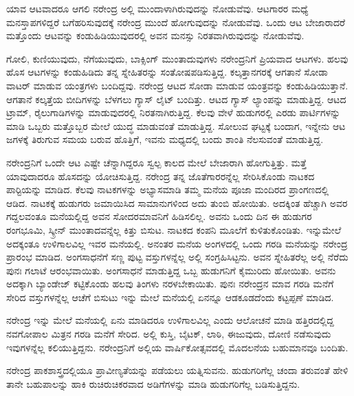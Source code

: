 ಯಾವ ಆಟವಾದರೂ ಆಗಲಿ ನರೇಂದ್ರ ಅಲ್ಲಿ ಮುಂದಾಳಾಗಿರುವುದನ್ನು ನೋಡುವೆವು. ಆಟಗಾರರ ಮಧ್ಯೆ ಮನಸ್ತಾಪಗಳಿದ್ದರೆ ಬಗೆಹರಿಸುವುದಕ್ಕೆ ನರೇಂದ್ರ ಮುಂದೆ ಹೋಗುವುದನ್ನು ನೋಡುವೆವು. ಒಂದು ಆಟ ಬೇಜಾರಾದರೆ ಮತ್ತೊಂದು ಆಟವನ್ನು ಕಂಡುಹಿಡಿಯುವುದರಲ್ಲಿ ಅವನ ಮನಸ್ಸು ನಿರತವಾಗಿರುವುದನ್ನು ನೋಡುವೆವು.

ಗೋಲಿ, ಕುಣಿಯುವುದು, ನೆಗೆಯುವುದು, ಬಾಕ್ಸಿಂಗ್ ಮುಂತಾದುವುಗಳು ನರೇಂದ್ರನಿಗೆ ಪ್ರಿಯವಾದ ಆಟಗಳು. ಹಲವು ಹೊಸ ಆಟಗಳನ್ನು ಕಂಡುಹಿಡಿದು ತನ್ನ ಸ್ನೇಹಿತರನ್ನು ಸಂತೋಷಪಡಿಸುತ್ತಿದ್ದ. ಕಲ್ಕತ್ತಾನಗರಕ್ಕೆ ಆಗತಾನೆ ಸೋಡಾ ವಾಟರ್ ಮಾಡುವ ಯಂತ್ರಗಳು ಬಂದಿದ್ದವು. ನರೇಂದ್ರ ಆಟದ ಸೋಡಾ ಮಾಡುವ ಯಂತ್ರವನ್ನು ಕಂಡುಹಿಡಿಯುತ್ತಾನೆ. ಆಗತಾನೆ ಕಲ್ಕತ್ತೆಯ ಬೀದಿಗಳನ್ನು ಬೆಳಗಲು ಗ್ಯಾಸ್ ಲೈಟ್ ಬಂದಿತ್ತು. ಆಟದ ಗ್ಯಾಸ್ ಲ್ಯಾಂಪನ್ನು ಮಾಡುತ್ತಿದ್ದ. ಆಟದ ಟ್ರಾಮ್, ರೈಲುಗಾಡಿಗಳನ್ನು ಮಾಡುವುದರಲ್ಲಿ ನಿರತನಾಗಿರುತ್ತಿದ್ದ. ಕೆಲವು ವೇಳೆ ಹುಡುಗರಲ್ಲಿ ಎರಡು ಪಾರ್ಟಿಗಳನ್ನು ಮಾಡಿ ಒಬ್ಬರು ಮತ್ತೊಬ್ಬರ ಮೇಲೆ ಯುದ್ಧ ಮಾಡುವಂತೆ ಮಾಡುತ್ತಿದ್ದ. ಸೋಲುವ ಘಟ್ಟಕ್ಕೆ ಬಂದಾಗ, ಇನ್ನೇನು ಆಟ ಜಗಳಕ್ಕೆ ತಿರುಗುವ ಸಮಯ ಬರುವ ಹೊತ್ತಿಗೆ, ಇವನು ಮಧ್ಯದಲ್ಲಿ ಬಂದು ಶಾಂತಿ ನೆಲಸುವಂತೆ ಮಾಡುತ್ತಿದ್ದ.

ನರೇಂದ್ರನಿಗೆ ಒಂದೇ ಆಟ ಎಷ್ಟೇ ಚೆನ್ನಾಗಿದ್ದರೂ ಸ್ವಲ್ಪ ಕಾಲದ ಮೇಲೆ ಬೇಜಾರಾಗಿ ಹೋಗುತ್ತಿತ್ತು. ಮತ್ತೆ ಯಾವುದಾದರೂ ಹೊಸದನ್ನು ಯೋಚಿಸುತ್ತಿದ್ದ. ನರೇಂದ್ರ ತನ್ನ ಜೊತೆಗಾರರನ್ನೆಲ್ಲ ಸೇರಿಸಿಕೊಂಡು ನಾಟಕದ ಪಾರ‍್ಟಿಯನ್ನು ಮಾಡಿದ. ಕೆಲವು ನಾಟಕಗಳನ್ನು ಅಭ್ಯಾಸಮಾಡಿ ತಮ್ಮ ಮನೆಯ ಪೂಜಾ ಮಂದಿರದ ಪ್ರಾಂಗಣದಲ್ಲಿ ಆಡಿದ. ನಾಟಕಕ್ಕೆ ಹುಡುಗರು ಜಮಾಯಿಸಿದ ಸಾಮಾನುಗಳಿಂದ ಅದು ತುಂಬಿ ಹೋಯಿತು. ಅದಕ್ಕಿಂತ ಹೆಚ್ಚಾಗಿ ಅವರ ಗದ್ದಲವಂತೂ ಮನೆಯಲ್ಲಿದ್ದ ಅವನ ಸೋದರಮಾವನಿಗೆ ಹಿಡಿಸಲಿಲ್ಲ. ಅವನು ಒಂದು ದಿನ ಈ ಹುಡುಗರ ರಂಗಭೂಮಿ, ಸ್ಕ್ರೀನ್ ಮುಂತಾದವನ್ನೆಲ್ಲ ಕಿತ್ತು ಬಿಸುಟ. ನಾಟಕದ ಕಂಪನಿ ಮೂಲೆಗೆ ಕುಳಿತುಕೊಂಡಿತು. ಇನ್ನುಮೇಲೆ ಅದಕ್ಕಂತೂ ಉಳಿಗಾಲವಿಲ್ಲ ಇವರ ಮನೆಯಲ್ಲಿ. ಅನಂತರ ಮನೆಯ ಅಂಗಳದಲ್ಲಿ ಒಂದು ಗರಡಿ ಮನೆಯನ್ನು ನರೇಂದ್ರ ಪ್ರಾರಂಭ ಮಾಡಿದ. ಅಂಗಸಾಧನೆಗೆ ಸಣ್ಣ ಪುಟ್ಟ ವಸ್ತುಗಳನ್ನೆಲ್ಲ ಅಲ್ಲಿ ಸಂಗ್ರಹಿಸಿಟ್ಟನು. ಅವನ ಸ್ನೇಹಿತರೆಲ್ಲ ಅಲ್ಲಿ ನೆರೆದು ಪುನಃ ಗಲಾಟೆ ಆರಂಭವಾಯಿತು. ಅಂಗಸಾಧನೆ ಮಾಡುತ್ತಿದ್ದ ಒಬ್ಬ ಹುಡುಗನಿಗೆ ಕೈಮುರಿದು ಹೋಯಿತು. ಅವನು ಅದಕ್ಕಾಗಿ ಬ್ಯಾಂಡೇಜ್ ಕಟ್ಟಿಕೊಂಡು ಹಲವು ತಿಂಗಳು ನರಳಬೇಕಾಯಿತು. ಪುನಃ ನರೇಂದ್ರನ ಮಾವ ಗರಡಿ ಮನೆಗೆ ಸೇರಿದ ವಸ್ತುಗಳನ್ನೆಲ್ಲ ಆಚೆಗೆ ಬಿಸುಟು ಇನ್ನು ಮೇಲೆ ಮನೆಯಲ್ಲಿ ಏನನ್ನೂ ಆಡಕೂಡದೆಂದು ಕಟ್ಟಪ್ಪಣೆ ಮಾಡಿದ.

ನರೇಂದ್ರ ಇನ್ನು ಮೇಲೆ ಮನೆಯಲ್ಲಿ ಏನು ಮಾಡಿದರೂ ಉಳಿಗಾಲವಿಲ್ಲ ಎಂದು ಆಲೋಚನೆ ಮಾಡಿ ಹತ್ತಿರದಲ್ಲಿದ್ದ ನವಗೋಪಾಲ ಮಿತ್ರನ ಗರಡಿ ಮನೆಗೆ ಸೇರಿದ. ಅಲ್ಲಿ ಕುಸ್ತಿ, ಬೈಟಕ್, ಲಾಠಿ, ಈಜುವುದು, ದೋಣಿ ನಡೆಸುವುದು ಇವುಗಳನ್ನೆಲ್ಲ ಕಲಿಯುತ್ತಿದ್ದನು. ನರೇಂದ್ರನಿಗೆ ಅಲ್ಲಿಯ ವಾರ್ಷಿಕೋತ್ಸವದಲ್ಲಿ ಮೊದಲನೆಯ ಬಹುಮಾನವೂ ಬಂದಿತು.

ನರೇಂದ್ರ ಪಾಕಶಾಸ್ತ್ರದಲ್ಲಿಯೂ ಪ್ರಾವೀಣ್ಯತೆಯನ್ನು ಪಡೆಯಲು ಯತ್ನಿಸುವನು. ಹುಡುಗರಿಗೆಲ್ಲ ಚಂದಾ ತರುವಂತೆ ಹೇಳಿ ತಾನೇ ಬಹುಪಾಲನ್ನು ಹಾಕಿ ರುಚಿರುಚಿಕರವಾದ ಅಡಿಗೆಗಳನ್ನು ಮಾಡಿ ಹುಡುಗರಿಗೆಲ್ಲ ಬಡಿಸುತ್ತಿದ್ದನು.

